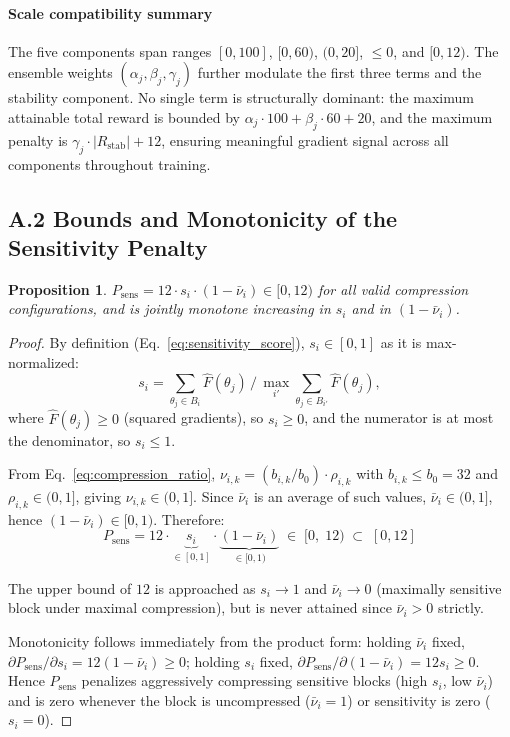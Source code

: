 \documentclass[preprint,12pt,authoryear]{elsarticle}
\newtheorem{proposition}{Proposition}
\begin{document}
\paragraph{Scale compatibility summary}
The five components span ranges $[0,100]$, $[0,60)$, $(0,20]$, $\leq 0$, and $[0,12)$.
The ensemble weights $(\alpha_j, \beta_j, \gamma_j)$ further modulate the first three
terms and the stability component. No single term is structurally dominant: the maximum
attainable total reward is bounded by
$\alpha_j \cdot 100 + \beta_j \cdot 60 + 20$, and the maximum penalty is
$\gamma_j \cdot |R_{\mathrm{stab}}| + 12$, ensuring meaningful gradient signal
across all components throughout training.

\subsection*{A.2 \; Bounds and Monotonicity of the Sensitivity Penalty}

\begin{proposition}
$P_{\mathrm{sens}} = 12 \cdot s_i \cdot (1 - \bar{\nu}_i) \in [0, 12)$ for all valid
compression configurations, and is jointly monotone increasing in $s_i$ and in
$(1-\bar{\nu}_i)$.
\end{proposition}

\begin{proof}
By definition (Eq.~\eqref{eq:sensitivity_score}), $s_i \in [0,1]$ as it is
max-normalized:\\ 
$$s_i = \sum_{\theta_j \in B_i}\hat{F}(\theta_j) \,/\,
\max_{i'}\sum_{\theta_j \in B_{i'}}\hat{F}(\theta_j),$$
 where $\hat{F}(\theta_j) \geq 0$
(squared gradients), so $s_i \geq 0$, and the numerator is at most the denominator,
so $s_i \leq 1$.

From Eq.~\eqref{eq:compression_ratio}, $\nu_{i,k} = (b_{i,k}/b_0)\cdot\rho_{i,k}$
with $b_{i,k} \leq b_0 = 32$ and $\rho_{i,k} \in (0,1]$, giving $\nu_{i,k} \in (0,1]$.
Since $\bar{\nu}_i$ is an average of such values, $\bar{\nu}_i \in (0,1]$, hence
$(1-\bar{\nu}_i) \in [0,1)$.
Therefore:
\begin{equation}
    P_{\mathrm{sens}} = 12 \cdot \underbrace{s_i}_{\in[0,1]} \cdot
    \underbrace{(1-\bar{\nu}_i)}_{\in[0,1)} \;\in\; [0,\;12)
    \;\subset\; [0,12]
\end{equation}

The upper bound of $12$ is approached as $s_i \to 1$ and $\bar{\nu}_i \to 0$
(maximally sensitive block under maximal compression), but is never attained since
$\bar{\nu}_i > 0$ strictly.

Monotonicity follows immediately from the product form: holding $\bar{\nu}_i$ fixed,
$\partial P_{\mathrm{sens}}/\partial s_i = 12(1-\bar{\nu}_i) \geq 0$; holding $s_i$
fixed, $\partial P_{\mathrm{sens}}/\partial(1-\bar{\nu}_i) = 12 s_i \geq 0$.
Hence $P_{\mathrm{sens}}$ penalizes aggressively compressing sensitive blocks
(high $s_i$, low $\bar{\nu}_i$) and is zero whenever the block is uncompressed
($\bar{\nu}_i = 1$) or sensitivity is zero ($s_i = 0$).
\end{proof}
\end{document}
